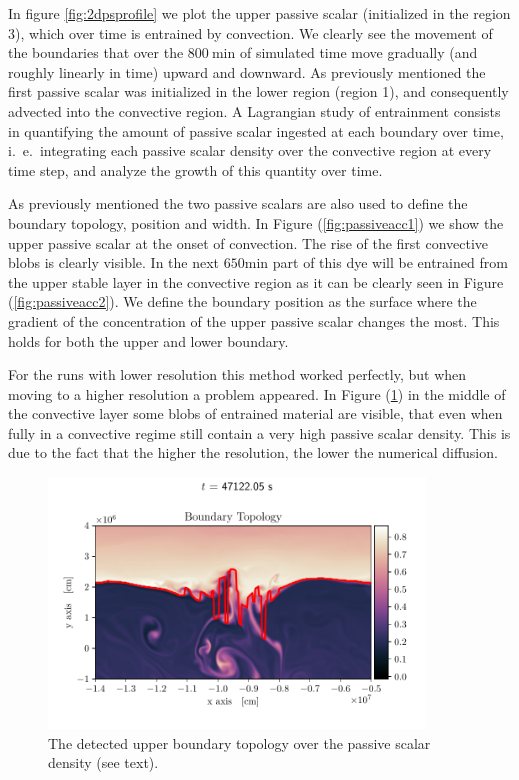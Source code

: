 In figure \ref{fig:2dpsprofile} we plot the upper passive scalar (initialized in the region 3), which over time is entrained by convection. We clearly see the movement of the boundaries that over the $800 \ \mathrm{min}$ of simulated time move gradually (and roughly linearly in time) upward and downward. As previously mentioned the first passive scalar was initialized in the lower region (region 1), and consequently advected into the convective region. A Lagrangian study of entrainment consists in quantifying the amount of passive scalar ingested at each boundary over time, i.\ e.\ integrating each passive scalar density over the convective region at every time step, and analyze the growth of this quantity over time.

As previously mentioned the two passive scalars are also used to define the boundary topology, position and width. In Figure (\ref{fig:passiveacc1}) we show the upper passive scalar at the onset of convection. The rise of the first convective blobs is clearly visible. In the next $650 \mathrm{min}$ part of this dye will be entrained from the upper stable layer in the convective region as it can be clearly seen in Figure (\ref{fig:passiveacc2}). We define the boundary position as the surface where the gradient of the concentration of the upper passive scalar changes the most. This holds for both the upper and lower boundary.
  
For the runs with lower resolution this method worked perfectly, but when moving to a higher resolution a problem appeared. In Figure (\ref{fig:topology})  in the middle of the convective layer some blobs of entrained material are visible, that even when fully in a convective regime still contain a very high passive scalar density. This is due to the fact that the higher the resolution, the lower the numerical diffusion.
  
\begin{figure}[t!]
\centering
\includegraphics[width=10cm]{./img/topology.pdf}
\caption{The detected upper boundary topology over the passive scalar density (see text).}
\label{fig:topology}
\centering
\end{figure}

